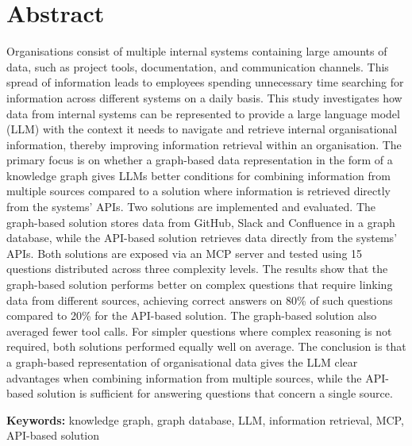 \section*{Abstract}\label{sec:abstract}

Organisations consist of multiple internal systems containing large amounts of data, such as project
tools, documentation, and communication channels.
This spread of information leads to employees spending unnecessary time searching for information
across different systems on a daily basis.
This study investigates how data from internal systems can be represented to provide a large language
model (LLM) with the context it needs to navigate and retrieve internal organisational information,
thereby improving information retrieval within an organisation.
The primary focus is on whether a graph-based data representation in the form of a knowledge graph
gives LLMs better conditions for combining information from multiple sources compared to a solution
where information is retrieved directly from the systems’ APIs.
Two solutions are implemented and evaluated. The graph-based solution stores data from GitHub,
Slack and Confluence in a graph database, while the API-based solution retrieves data directly from
the systems’ APIs. Both solutions are exposed via an MCP server and tested using 15 questions
distributed across three complexity levels.
The results show that the graph-based solution performs better on complex questions that require
linking data from different sources, achieving correct answers on 80\% of such questions compared
to 20\% for the API-based solution. The graph-based solution also averaged fewer tool calls.
For simpler questions where complex reasoning is not required, both solutions performed equally well on average.
The conclusion is that a graph-based representation of organisational data gives the LLM clear
advantages when combining information from multiple sources, while the API-based solution is
sufficient for answering questions that concern a single source.

\textbf{Keywords:} knowledge graph, graph database, LLM, information retrieval, MCP,
API-based solution
